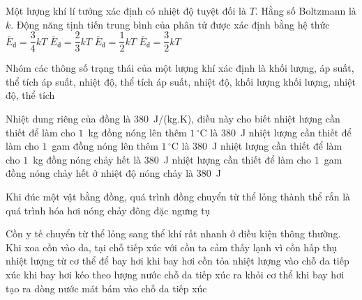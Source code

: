 	\begin{ex}%
		Một lượng khí lí tưởng xác định có nhiệt độ tuyệt đối là $T$. Hằng số Boltzmann là $k$. Động năng tịnh tiến trung bình của phân tử được xác định bằng hệ thức
		\choice
		{$\overline{E}_{\text{đ}}=\dfrac{3}{4}kT$}
		{$\overline{E}_{\text{đ}}=\dfrac{2}{3}kT$}
		{$\overline{E}_{\text{đ}}=\dfrac{1}{2}kT$}
		{\True $\overline{E}_{\text{đ}}=\dfrac{3}{2}kT$}
	\end{ex}

	\begin{ex}%
		Nhóm các thông số trạng thái của một lượng khí xác định là
		\choice
		{khối lượng, áp suất, thể tích}
		{\True áp suất, nhiệt độ, thể tích}
		{áp suất, nhiệt độ, khối lượng}
		{khối lượng, nhiệt độ, thể tích}
	\end{ex}

	\begin{ex}%
		Nhiệt dung riêng của đồng là $380$~J/(kg.K), điều này cho biết
		\choice
		{\True nhiệt lượng cần thiết để làm cho $1$~kg đồng nóng lên thêm $1\,^\circ\text{C}$ là $380$~J}
		{nhiệt lượng cần thiết để làm cho $1$~gam đồng nóng lên thêm $1\,^\circ\text{C}$ là $380$~J}
		{nhiệt lượng cần thiết để làm cho $1$~kg đồng nóng chảy hết là $380$~J}
		{nhiệt lượng cần thiết để làm cho $1$~gam đồng nóng chảy hết ở nhiệt độ nóng chảy là $380$~J}
	\end{ex}

	\begin{ex}%
		Khi đúc một vật bằng đồng, quá trình đồng chuyển từ thể lỏng thành thể rắn là quá trình
		\choice
		{hóa hơi}
		{nóng chảy}
		{\True đông đặc}
		{ngưng tụ}
	\end{ex}

	\begin{ex}%
		Cồn y tế chuyển từ thể lỏng sang thể khí rất nhanh ở điều kiện thông thường. Khi xoa cồn vào da, tại chỗ tiếp xúc với cồn ta cảm thấy lạnh vì
		\choice
		{\True cồn hấp thụ nhiệt lượng từ cơ thể để bay hơi}
		{khi bay hơi cồn tỏa nhiệt lượng vào chỗ da tiếp xúc}
		{khi bay hơi kéo theo lượng nước chỗ da tiếp xúc ra khỏi cơ thể}
		{khi bay hơi tạo ra dòng nước mát bám vào chỗ da tiếp xúc}
	\end{ex}

